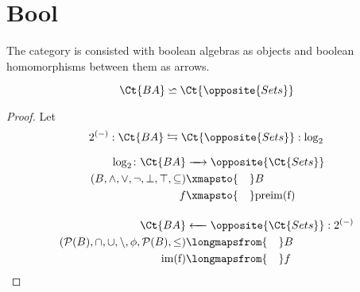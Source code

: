 \section{Bool}

\begin{Def}
The category  is consisted with boolean algebras as objects and boolean homomorphisms between them as arrows.
\end{Def}

\begin{Lem}
\begin{equation}
    \Ct{BA} \backsimeq \Ct{\opposite{Sets}}
\end{equation}
\end{Lem}
\begin{proof}
Let
\begin{equation}
    2^{(-)}:\Ct{BA} \leftrightarrows \Ct{\opposite{Sets}} : \log_2
\end{equation}


\begin{align}
\log_2 \colon \Ct{BA} &\xrightarrow{\quad} \opposite{\Ct{Sets}}\\
(B, \land, \lor, \neg, \bot, \top, \subseteq) &\xmapsto{\quad} B\\
f &\xmapsto{\quad}  \rm{preim}(f) \\[1em]
\Ct{BA} &\xleftarrow{\quad} \opposite{\Ct{Sets}} : 2^{(-)} \\
(\mathcal{P}(B), \cap, \cup, \setminus, \phi, \mathcal{P}(B), \leq) &\longmapsfrom{\quad} B \\
\rm{im}(f) &\longmapsfrom{\quad} f
\end{align}

\end{proof}




